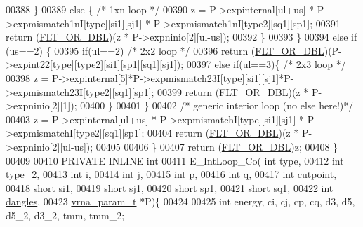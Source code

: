 \begin{DoxyCode}
00388       \}
00389       \textcolor{keywordflow}{else} \{  \textcolor{comment}{/* 1xn loop */}
00390         z = P->expinternal[ul+us] * P->expmismatch1nI[type][si1][sj1] * P->expmismatch1nI[type2][sq1][sp1];
00391         \textcolor{keywordflow}{return} (\hyperlink{group__data__structures_ga31125aeace516926bf7f251f759b6126}{FLT\_OR\_DBL})(z * P->expninio[2][ul-us]);
00392       \}
00393     \}
00394     \textcolor{keywordflow}{else} \textcolor{keywordflow}{if} (us==2) \{
00395       \textcolor{keywordflow}{if}(ul==2) \textcolor{comment}{/* 2x2 loop */}
00396         \textcolor{keywordflow}{return} (\hyperlink{group__data__structures_ga31125aeace516926bf7f251f759b6126}{FLT\_OR\_DBL})(P->expint22[type][type2][si1][sp1][sq1][sj1]);
00397       \textcolor{keywordflow}{else} \textcolor{keywordflow}{if}(ul==3)\{              \textcolor{comment}{/* 2x3 loop */}
00398         z = P->expinternal[5]*P->expmismatch23I[type][si1][sj1]*P->expmismatch23I[type2][sq1][sp1];
00399         \textcolor{keywordflow}{return} (\hyperlink{group__data__structures_ga31125aeace516926bf7f251f759b6126}{FLT\_OR\_DBL})(z * P->expninio[2][1]);
00400       \}
00401     \}
00402     \textcolor{comment}{/* generic interior loop (no else here!)*/}
00403     z = P->expinternal[ul+us] * P->expmismatchI[type][si1][sj1] * P->expmismatchI[type2][sq1][sp1];
00404     \textcolor{keywordflow}{return} (\hyperlink{group__data__structures_ga31125aeace516926bf7f251f759b6126}{FLT\_OR\_DBL})(z * P->expninio[2][ul-us]);
00405 
00406   \}
00407   \textcolor{keywordflow}{return} (\hyperlink{group__data__structures_ga31125aeace516926bf7f251f759b6126}{FLT\_OR\_DBL})z;
00408 \}
00409 
00410 PRIVATE INLINE \textcolor{keywordtype}{int}
00411 E\_IntLoop\_Co( \textcolor{keywordtype}{int} type,
00412               \textcolor{keywordtype}{int} type\_2,
00413               \textcolor{keywordtype}{int} i,
00414               \textcolor{keywordtype}{int} j,
00415               \textcolor{keywordtype}{int} p,
00416               \textcolor{keywordtype}{int} q,
00417               \textcolor{keywordtype}{int} cutpoint,
00418               \textcolor{keywordtype}{short} si1,
00419               \textcolor{keywordtype}{short} sj1,
00420               \textcolor{keywordtype}{short} sp1,
00421               \textcolor{keywordtype}{short} sq1,
00422               \textcolor{keywordtype}{int} \hyperlink{group__model__details_ga72b511ed1201f7e23ec437e468790d74}{dangles},
00423               \hyperlink{group__energy__parameters_structvrna__param__s}{vrna\_param\_t} *P)\{
00424 
00425   \textcolor{keywordtype}{int} energy, ci, cj, cp, cq, d3, d5, d5\_2, d3\_2, tmm, tmm\_2;

\end{DoxyCode}
